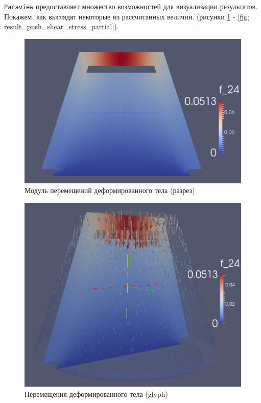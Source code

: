 \documentclass[a4paper, 14pt]{extreport}
\begin{document}
\texttt{Paraview} предоставляет множество возможностей
для визуализации результатов.
Покажем, как выглядят некоторые из рассчитанных величин.
(рисунки \ref{fig: result_push_displacement_slice} - 
\ref{fig: result_push_shear_stress_partial}).

\begin{figure}[H]
	\center
	\includegraphics[scale=0.4]{pictures/result_push_displacement_slice.png}
	\caption{Модуль перемещений деформированного тела (разрез)}
	\label{fig: result_push_displacement_slice}
\end{figure}

\begin{figure}[H]
	\center
	\includegraphics[scale=0.5]{pictures/result_push_displacement_glyph.png}
	\caption{Перемещения деформированного тела (glyph)}
	\label{fig: result_push_displacement_glyph}
\end{figure}
\end{document}
